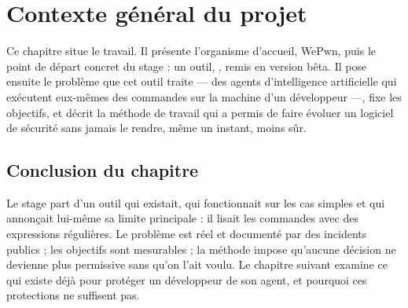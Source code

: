 \chapter{Contexte général du projet}
\label{ch:contexte}

Ce chapitre situe le travail. Il présente l'organisme d'accueil, WePwn, puis le
point de départ concret du stage : un outil, \demo{}, remis en version bêta. Il pose
ensuite le problème que cet outil traite --- des agents d'intelligence artificielle
qui exécutent eux-mêmes des commandes sur la machine d'un développeur ---, fixe les
objectifs, et décrit la méthode de travail qui a permis de faire évoluer un logiciel
de sécurité sans jamais le rendre, même un instant, moins sûr.








\section*{Conclusion du chapitre}
Le stage part d'un outil qui existait, qui fonctionnait sur les cas simples et qui
annonçait lui-même sa limite principale : il lisait les commandes avec des expressions
régulières. Le problème est réel et documenté par des incidents publics ; les objectifs
sont mesurables ; la méthode impose qu'aucune décision ne devienne plus permissive sans
qu'on l'ait voulu. Le chapitre suivant examine ce qui existe déjà pour protéger un
développeur de son agent, et pourquoi ces protections ne suffisent pas.
